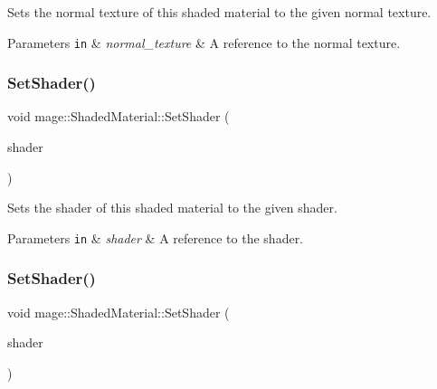 Sets the normal texture of this shaded material to the given normal texture.


\begin{DoxyParams}[1]{Parameters}
\mbox{\tt in}  & {\em normal\+\_\+texture} & A reference to the normal texture. \\
\hline
\end{DoxyParams}
\hypertarget{structmage_1_1_shaded_material_a65646872fce0961e7ac346be162e89ec}{}\label{structmage_1_1_shaded_material_a65646872fce0961e7ac346be162e89ec} 
\subsubsection{\texorpdfstring{Set\+Shader()}{SetShader()}\hspace{0.1cm}{\footnotesize\ttfamily [1/2]}}
{\footnotesize\ttfamily void mage\+::\+Shaded\+Material\+::\+Set\+Shader (\begin{DoxyParamCaption}\item[{const \hyperlink{structmage_1_1_combined_shader}{Combined\+Shader} \&}]{shader }\end{DoxyParamCaption})}

Sets the shader of this shaded material to the given shader.


\begin{DoxyParams}[1]{Parameters}
\mbox{\tt in}  & {\em shader} & A reference to the shader. \\
\hline
\end{DoxyParams}
\hypertarget{structmage_1_1_shaded_material_ae1c0fe052ef1cfb3c65ddf1ad9de8abb}{}\label{structmage_1_1_shaded_material_ae1c0fe052ef1cfb3c65ddf1ad9de8abb} 
\subsubsection{\texorpdfstring{Set\+Shader()}{SetShader()}\hspace{0.1cm}{\footnotesize\ttfamily [2/2]}}
{\footnotesize\ttfamily void mage\+::\+Shaded\+Material\+::\+Set\+Shader (\begin{DoxyParamCaption}\item[{\hyperlink{structmage_1_1_combined_shader}{Combined\+Shader} \&\&}]{shader }\end{DoxyParamCaption})}

